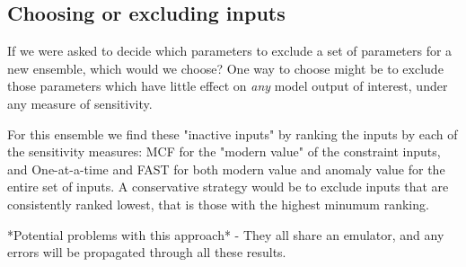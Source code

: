 \documentclass[gmd, manuscript]{copernicus}
\begin{document}
\subsection{Choosing or excluding inputs}

If we were asked to decide which parameters to exclude a set of parameters for a new ensemble, which would we choose? One way to choose might be to exclude those parameters which have little effect on \emph{any} model output of interest, under any measure of sensitivity.

For this ensemble we find these "inactive inputs" by ranking the inputs by each of the sensitivity measures: MCF for the "modern value" of the constraint inputs, and One-at-a-time and FAST for both modern value and anomaly value for the entire set of inputs. A conservative strategy would be to exclude inputs that are consistently ranked lowest, that is those with the highest minumum ranking.

*Potential problems with this approach* - They all share an emulator, and any errors will be propagated through all these results.  
\end{document}
